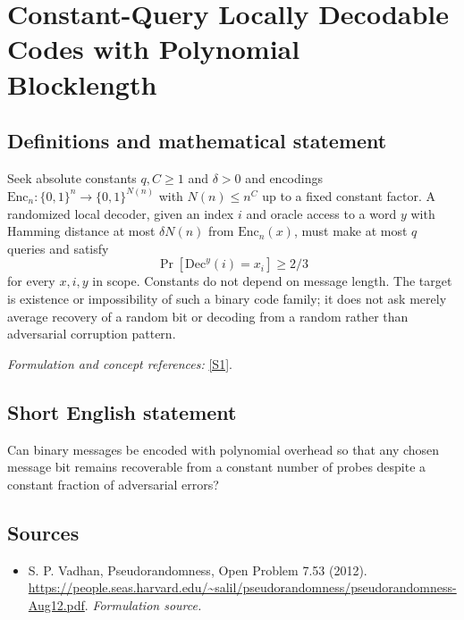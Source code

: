 \documentclass[11pt]{article}
\begin{document}
\section*{\texorpdfstring{Constant-Query Locally Decodable Codes with Polynomial Blocklength}{Constant-Query Locally Decodable Codes with Polynomial Blocklength}}\label{30006818}
\subsection{Definitions and mathematical statement}
Seek absolute constants $q,C\ge1$ and $\delta>0$ and encodings
$\mathrm{Enc}_n:\{0,1\}^n\to\{0,1\}^{N(n)}$ with $N(n)\le n^C$ up to a fixed constant factor. A randomized local decoder, given an index $i$ and oracle access to a word $y$ with Hamming distance at most $\delta N(n)$ from $\mathrm{Enc}_n(x)$, must make at most $q$ queries and satisfy
\[
 \Pr[\mathrm{Dec}^y(i)=x_i]\ge2/3
\]
for every $x,i,y$ in scope. Constants do not depend on message length. The target is existence or impossibility of such a binary code family; it does not ask merely average recovery of a random bit or decoding from a random rather than adversarial corruption pattern.
\par\smallskip\textit{Formulation and concept references:} \href{https://people.seas.harvard.edu/~salil/pseudorandomness/pseudorandomness-Aug12.pdf}{[S1]}.

\subsection{Short English statement}
Can binary messages be encoded with polynomial overhead so that any chosen message bit remains recoverable from a constant number of probes despite a constant fraction of adversarial errors?
\subsection{Sources}
\begin{itemize}
\item[S1]S. P. Vadhan, Pseudorandomness, Open Problem 7.53 (2012).
\url{https://people.seas.harvard.edu/~salil/pseudorandomness/pseudorandomness-Aug12.pdf}.
\textit{Formulation source.}
\end{itemize}
\end{document}
